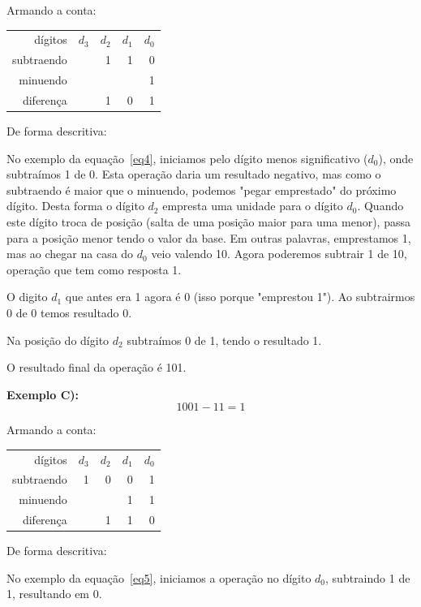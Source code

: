 Armando a conta:
\begin{table}[h]
	\centering
	\begin{tabular}{r|rrrr}
		dígitos		& $d_3$	& $d_2$ & $d_1$ & $d_0$ \\
		subtraendo  &  		&   1 	& 1 	& 0 \\
		minuendo 	&  		&   	& 	 	& 1 \\
		\hline
		diferença  	&  		&   1 	& 0 	& 1 \\
	\end{tabular}
\end{table}

De forma descritiva: 

No exemplo da equação~\ref{eq4}, iniciamos pelo dígito menos significativo ($d_0$), onde subtraímos 1 de 0. Esta operação daria um resultado negativo, mas como o subtraendo é maior que o minuendo, podemos "pegar emprestado" do próximo dígito. Desta forma o dígito $d_2$ empresta uma unidade para o dígito $d_0$. Quando este dígito troca de posição (salta de uma posição maior para uma menor), passa para a posição menor tendo o valor da base. Em outras palavras, emprestamos 1, mas ao chegar na casa do $d_0$ veio valendo 10. Agora poderemos subtrair 1 de 10, operação que tem como resposta 1.

O digito $d_1$ que antes era 1 agora é 0 (isso porque "emprestou 1"). Ao subtrairmos 0 de 0 temos resultado 0.

Na posição do dígito $d_2$ subtraímos 0 de 1, tendo o resultado 1.

O resultado final da operação é 101.

\textbf{Exemplo C):}
\begin{equation}\label{eq5}
1001 - 11 = 1
\end{equation}

Armando a conta:
\begin{table}[h]
	\centering
	\begin{tabular}{r|rrrr}
		dígitos		& $d_3$	& $d_2$ & $d_1$ & $d_0$ \\
		subtraendo  &  	1	&   0 	&   0 	& 1 \\
		minuendo 	&  		&   	& 	1 	& 1 \\
		\hline
		diferença  	&  		&   1 	&   1 	& 0 \\
	\end{tabular}
\end{table}

De forma descritiva: 

No exemplo da equação~\ref{eq5}, iniciamos a operação no dígito $d_0$, subtraindo 1 de 1, resultando em 0.

